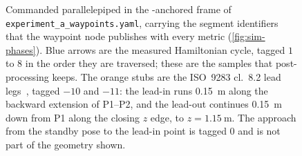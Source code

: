 \begin{figure}[htbp]
  \caption[Eight-corner commanded path for Experiment~A]{%
    Commanded parallelepiped in the \ee{}-anchored frame of
    \texttt{experiment\_a\_waypoints.yaml}, carrying the segment
    identifiers that the waypoint node publishes with every metric
    (\cref{fig:sim-phases}). Blue arrows are the measured Hamiltonian
    cycle, tagged $1$ to $8$ in the order they are traversed; these are
    the samples that post-processing keeps. The orange stubs are the
    ISO~9283 cl.~8.2 lead legs~\cite{ISO9283}, tagged $-10$ and $-11$:
    the lead-in runs \qty{0.15}{\meter} along the backward extension of
    P1--P2, and the lead-out continues \qty{0.15}{\meter} down from P1
    along the closing $z$ edge, to $z=\qty{1.15}{\meter}$. The approach
    from the standby pose to the lead-in point is tagged $0$ and is not
    part of the geometry shown.}
  \label{fig:sim-box}
\end{figure}

